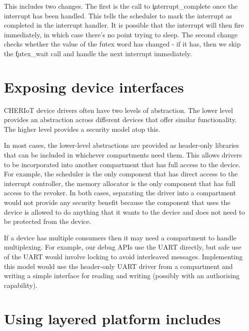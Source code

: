 \begin{cxxsnippet}
do
{
    uint32_t last = *ethernetFutex;
    // Handle interrupt here
    interrupt_complete(STATIC_SEALED_VALUE(ethernetInterruptCapability));
\} while ((last != *ethernetFutex) || futex_wait(ethernetFutex, last) == 0);
\end{cxxsnippet}

This includes two changes.
The first is the call to \c{interrupt_complete} once the interrupt has been handled.
This tells the scheduler to mark the interrupt as completed in the interrupt handler.
It is possible that the interrupt will then fire immediately, in which case there's no point trying to sleep.
The second change checks whether the value of the futex word has changed - if it has, then we skip the \c{futex_wait} call and handle the next interrupt immediately.

\section{Exposing device interfaces}

CHERIoT device drivers often have two levels of abstraction.
The lower level provides an abstraction across different devices that offer similar functionality.
The higher level provides a security model atop this.

In most cases, the lower-level abstractions are provided as header-only libraries that can be included in whichever compartments need them.
This allows drivers to be incorporated into another compartment that has full access to the device.
For example, the scheduler is the only component that has direct access to the interrupt controller, the memory allocator is the only component that has full access to the revoker.
In both cases, separating the driver into a compartment would not provide any security benefit because the component that uses the device is allowed to do anything that it wants to the device and does not need to be protected from the device.

If a device has multiple consumers then it may need a compartment to handle multiplexing.
For example, our debug APIs use the UART directly, but safe use of the UART would involve locking to avoid interleaved messages.
Implementing this model would use the header-only UART driver from a compartment and writing a simple interface for reading and writing (possibly with an authorising capability).

\section{Using layered platform includes}


